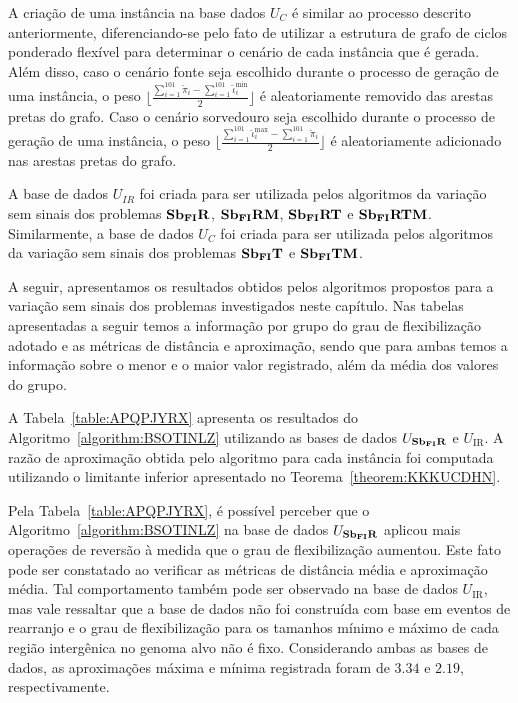 A criação de uma instância na base dados $U_{C}$ é similar ao processo descrito anteriormente, diferenciando-se pelo fato de utilizar a estrutura de grafo de ciclos ponderado flexível para determinar o cenário de cada instância que é gerada. Além disso, caso o cenário fonte seja escolhido durante o processo de geração de uma instância, o peso $\lfloor\frac{\sum_{i = 1}^{101}\breve\pi_i - \sum_{i = 1}^{101}\breve\iota^{\min}_i}{2}\rfloor$ é aleatoriamente removido das arestas pretas do grafo. Caso o cenário sorvedouro seja escolhido durante o processo de geração de uma instância, o peso $\lfloor\frac{\sum_{i = 1}^{101}\breve\iota^{\max}_i - \sum_{i = 1}^{101}\breve\pi_i}{2}\rfloor$ é aleatoriamente adicionado nas arestas pretas do grafo. 

A base de dados $U_{IR}$ foi criada para ser utilizada pelos algoritmos da variação sem sinais dos problemas $\textbf{Sb\textsubscript{FI}R}{}$, $\textbf{Sb\textsubscript{FI}RM}{}$, $\textbf{Sb\textsubscript{FI}RT}{}$ e $\textbf{Sb\textsubscript{FI}RTM}{}$. Similarmente, a base de dados $U_{C}$ foi criada para ser utilizada pelos algoritmos da variação sem sinais dos problemas $\textbf{Sb\textsubscript{FI}T}{}$ e $\textbf{Sb\textsubscript{FI}TM}{}$.

A seguir, apresentamos os resultados obtidos pelos algoritmos propostos para a variação sem sinais dos problemas investigados neste capítulo. Nas tabelas apresentadas a seguir temos a informação por grupo do grau de flexibilização adotado e as métricas de distância e aproximação, sendo que para ambas temos a informação sobre o menor e o maior valor registrado, além da média dos valores do grupo.

A Tabela~\ref{table:APQPJYRX} apresenta os resultados do Algoritmo~\ref{algorithm:BSOTINLZ} utilizando as bases de dados $U_{\textbf{Sb\textsubscript{FI}R}}{}$ e $U_{\text{IR}}$. A razão de aproximação obtida pelo algoritmo para cada instância foi computada utilizando o limitante inferior apresentado no Teorema~\ref{theorem:KKKUCDHN}.



Pela Tabela~\ref{table:APQPJYRX}, é possível perceber que o Algoritmo~\ref{algorithm:BSOTINLZ} na base de dados $U_{\textbf{Sb\textsubscript{FI}R}}{}$ aplicou mais operações de reversão à medida que o grau de flexibilização aumentou. Este fato pode ser constatado ao verificar as métricas de distância média e aproximação média. Tal comportamento também pode ser observado na base de dados $U_{\text{IR}}$, mas vale ressaltar que a base de dados não foi construída com base em eventos de rearranjo e o grau de flexibilização para os tamanhos mínimo e máximo de cada região intergênica no genoma alvo não é fixo. Considerando ambas as bases de dados, as aproximações máxima e mínima registrada foram de $3.34$ e $2.19$, respectivamente.

